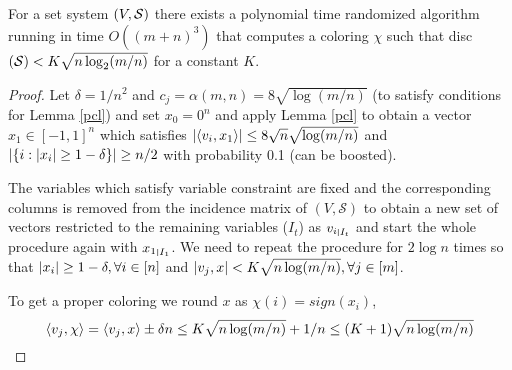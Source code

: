 \begin{theorem}
For a set system $\left(V,\mathcal{S} \right )$ there exists a polynomial time randomized algorithm running in time $O((m+n)^3)$ that computes a coloring $\chi$ such that disc$\left(\mathcal{S} \right ) < K\sqrt{n\log_2(m/n)}$ for a constant $K$.
\end{theorem}
\begin{proof}
Let $\delta = 1/n^2$ and $c_j = \alpha(m,n) = 8 \sqrt{\log(m/n)}$ (to satisfy conditions for Lemma \ref{pcl}) and set $x_0 =0^n$ and apply Lemma \ref{pcl} to obtain a vector $x_1 \in [-1,1]^n$ which satisfies
$\left\lvert \left\langle v_i,x_1\right\rangle \right\rvert \leq 8\sqrt{n}\sqrt{\log(m/n)}$ and $\left\lvert \left\{i: \left\lvert x_i \right\rvert \geq 1 - \delta\right\} \right\rvert \geq n/2$ with probability 0.1 (can be boosted).\par
The variables which satisfy variable constraint are fixed and the corresponding columns is removed from the incidence matrix of $(V,\mathcal{S})$ to obtain a new set of vectors restricted to the remaining variables ($I_t$) as ${v_i}_{\mkern 1mu \vrule height 1ex\mkern2mu {I_t}}$ and start the whole procedure again with ${x_1}_{\mkern 1mu \vrule height 1ex\mkern2mu {I_1}}$.
We need to repeat the procedure for $2\log n$ times so that $\left\lvert x_i \right\rvert \geq 1- \delta, \forall i \in [n]$ and $\left\lvert v_j,x \right\rvert < K\sqrt{n\log(m/n)}, \forall j \in [m]$.

To get a proper coloring we round $x$ as $\chi(i) = sign(x_i) $,
\[ \left\langle v_j,\chi\right\rangle = \left\langle v_j,x\right\rangle \pm \delta n \leq K\sqrt{n\log(m/n)} + 1/n \leq (K+1)\sqrt{n\log(m/n)} \]
\end{proof}
